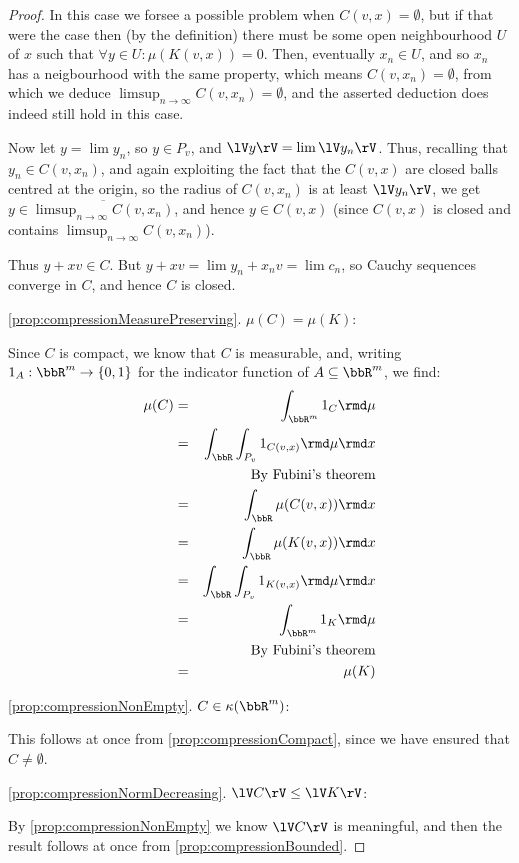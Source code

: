 \documentclass[a4paper,11pt]{article}
\begin{document}
\begin{proof}
In this case we forsee a possible problem when $C(v,x)=\emptyset$, but if that
were the case then (by the definition)
there must be some open neighbourhood $U$ of $x$ such that
$\forall y\in U:\mu(K(v,x))=0$.  Then, eventually $x_n\in U$, and so
$x_n$ has a neigbourhood with the same property, which means
$C(v,x_n)=\emptyset$,
from which we deduce $\limsup_{n\to\infty}C(v,x_n)=\emptyset$, and the asserted
deduction does indeed still hold in this case.

Now let $y=\lim y_n$, so $y\in P_v$, and $\lV y\rV=\lim\lV y_n\rV$.  Thus,
recalling that $y_n\in C(v,x_n)$, and again exploiting the fact that the
$C(v,x)$ are closed balls centred at the origin, so the radius of $C(v,x_n)$ is
at least $\lV y_n\rV$, we get $y\in\overline{\limsup_{n\to\infty}C(v,x_n)}$,
and hence $y\in C(v,x)$
(since $C(v,x)$ is closed and contains $\limsup_{n\to\infty}C(v,x_n)$).

Thus $y+xv\in C$.  But $y+xv=\lim y_n+x_nv=\lim c_n$, so Cauchy sequences
converge in $C$, and hence $C$ is closed.

\ref{prop:compressionMeasurePreserving}. $\mu(C)=\mu(K)$:

Since $C$ is compact, we know that $C$ is measurable, and, writing
$1_A:\bbR^m\to\{0,1\}$ for the indicator
function of $A\subseteq\bbR^m$, we find:
%
\begin{eqnarray*}
\mu(C)
&=& \int_{\bbR^m}1_C\rmd\mu \\
&=& \int_\bbR\int_{P_v}1_{C(v,x)}\rmd\mu\rmd x \\
&& \textrm{By Fubini's theorem} \\
&=& \int_\bbR\mu(C(v,x))\rmd x \\
&=& \int_\bbR\mu(K(v,x))\rmd x \\
&=& \int_\bbR\int_{P_v}1_{K(v,x)}\rmd\mu\rmd x \\
&=& \int_{\bbR^m}1_K\rmd\mu \\
&& \textrm{By Fubini's theorem} \\
&=& \mu(K)
\end{eqnarray*}

\ref{prop:compressionNonEmpty}.
$C\in\kappa(\bbR^m)$:

This follows at once from \ref{prop:compressionCompact}, since we have ensured
that $C\not=\emptyset$.

\ref{prop:compressionNormDecreasing}.
$\lV C\rV\leq\lV K\rV$:

By \ref{prop:compressionNonEmpty} we know $\lV C\rV$ is meaningful, and then
the result follows at once from \ref{prop:compressionBounded}.


\end{proof}
\end{document}
